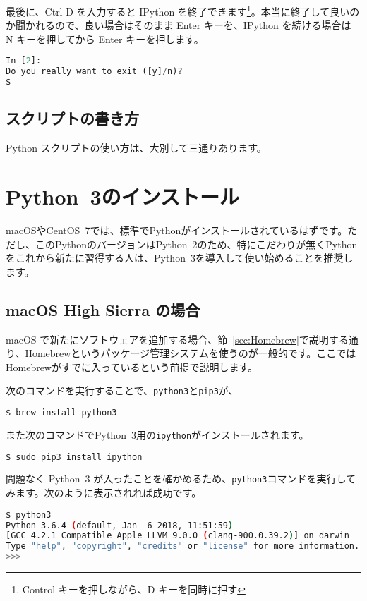 最後に、Ctrl-D を入力すると IPython を終了できます\footnote{Control キーを押しながら、D キーを同時に押す}。本当に終了して良いのか聞かれるので、良い場合はそのまま Enter キーを、IPython を続ける場合は N キーを押してから Enter キーを押します。

\begin{lstlisting}[language=python]
In [2]:
Do you really want to exit ([y]/n)? 
$ 
\end{lstlisting}

\subsection{スクリプトの書き方}

Python スクリプトの使い方は、大別して三通りあります。

\section{Python~3のインストール}
\label{sec:Python_Install}

macOSやCentOS~7では、標準でPythonがインストールされているはずです。ただし、このPythonのバージョンはPython~2のため、特にこだわりが無くPythonをこれから新たに習得する人は、Python~3を導入して使い始めることを推奨します。

\subsection{macOS High Sierra の場合}

macOS で新たにソフトウェアを追加する場合、節~\ref{sec:Homebrew}で説明する通り、Homebrewというパッケージ管理システムを使うのが一般的です。ここではHomebrewがすでに入っているという前提で説明します。

次のコマンドを実行することで、\texttt{python3}と\texttt{pip3}が、
\begin{lstlisting}[language=bash]
$ brew install python3
\end{lstlisting}
また次のコマンドでPython~3用の\texttt{ipython}がインストールされます。
\begin{lstlisting}[language=bash]
$ sudo pip3 install ipython
\end{lstlisting}

問題なく Python~3 が入ったことを確かめるため、\texttt{python3}コマンドを実行してみます。次のように表示されれば成功です。
\begin{lstlisting}[language=bash]
$ python3                  
Python 3.6.4 (default, Jan  6 2018, 11:51:59) 
[GCC 4.2.1 Compatible Apple LLVM 9.0.0 (clang-900.0.39.2)] on darwin
Type "help", "copyright", "credits" or "license" for more information.
>>> 
\end{lstlisting}

